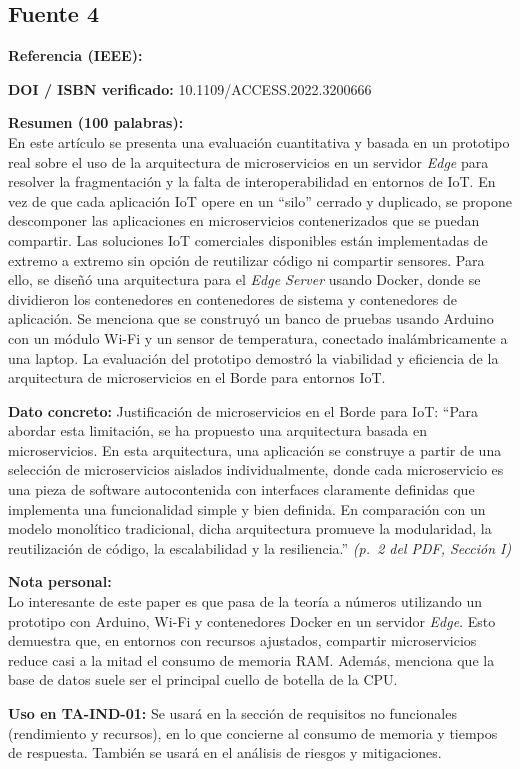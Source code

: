 \documentclass[11pt,a4paper]{article}
\newcommand{\ficha}[7]{%
  \begin{tcolorbox}[colback=white,colframe=black!60,
    title={Ficha bibliográfica},breakable]
    \textbf{Referencia (IEEE):}\\
    \fullcite{#1}

    \medskip
    \textbf{DOI / ISBN verificado:} #2

    \medskip
    \textbf{Resumen (100 palabras):}\\
    #3

    \medskip
    \textbf{Dato concreto:} #4 \textit{(#5)}

    \medskip
    \textbf{Nota personal:}\\
    #6

    \medskip
    \textbf{Uso en TA-IND-01:} #7
  \end{tcolorbox}
  \vspace{1em}
}
\begin{document}
\subsection{Fuente 4}
\ficha{fuente4}{10.1109/ACCESS.2022.3200666}{En este artículo se presenta una evaluación cuantitativa y basada en un prototipo real sobre el uso de la arquitectura de microservicios en un servidor \textit{Edge} para resolver la fragmentación y la falta de interoperabilidad en entornos de IoT. En vez de que cada aplicación IoT opere en un \enquote{silo} cerrado y duplicado, se propone descomponer las aplicaciones en microservicios contenerizados que se puedan compartir. Las soluciones IoT comerciales disponibles están implementadas de extremo a extremo sin opción de reutilizar código ni compartir sensores. Para ello, se diseñó una arquitectura para el \textit{Edge Server} usando Docker, donde se dividieron los contenedores en contenedores de sistema y contenedores de aplicación. Se menciona que se construyó un banco de pruebas usando Arduino con un módulo Wi-Fi y un sensor de temperatura, conectado inalámbricamente a una laptop. La evaluación del prototipo demostró la viabilidad y eficiencia de la arquitectura de microservicios en el Borde para entornos IoT.}{Justificación de microservicios en el Borde para IoT: \enquote{Para abordar esta limitación, se ha propuesto una arquitectura basada en microservicios. En esta arquitectura, una aplicación se construye a partir de una selección de microservicios aislados individualmente, donde cada microservicio es una pieza de software autocontenida con interfaces claramente definidas que implementa una funcionalidad simple y bien definida. En comparación con un modelo monolítico tradicional, dicha arquitectura promueve la modularidad, la reutilización de código, la escalabilidad y la resiliencia.}}{p.~2 del PDF, Sección I}{Lo interesante de este paper es que pasa de la teoría a números utilizando un prototipo con Arduino, Wi-Fi y contenedores Docker en un servidor \textit{Edge}. Esto demuestra que, en entornos con recursos ajustados, compartir microservicios reduce casi a la mitad el consumo de memoria RAM. Además, menciona que la base de datos suele ser el principal cuello de botella de la CPU.}{Se usará en la sección de requisitos no funcionales (rendimiento y recursos), en lo que concierne al consumo de memoria y tiempos de respuesta. También se usará en el análisis de riesgos y mitigaciones.}
\end{document}

